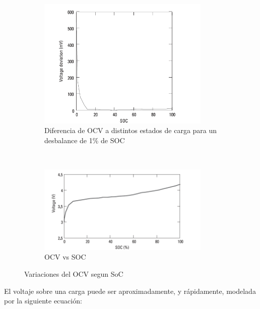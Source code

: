 \documentclass[10pt,a4paper]{article}
\begin{document}
\begin{figure}[h!]
    \begin{subfigure}[t]{.5\textwidth}
	\begin{center}
	    \includegraphics[width=0.9\textwidth]{diff_imbalance.png}
	    \caption{Diferencia de OCV a distintos estados de carga para un desbalance
	    de 1\% de SOC}
	    \label{diff_imbalance}
	\end{center}
    \end{subfigure}%
    ~
    \begin{subfigure}[t]{.5\textwidth}
	\begin{center}
	    \includegraphics[width=0.9\textwidth]{SOC_vs_OCV_equalization.png}
	    \caption{OCV vs SOC}
	    \label{OCV_SOC_equalization_figure}
	\end{center}
    \end{subfigure}
    \caption{Variaciones del OCV segun SoC}
    \label{rep_OCV_SOC}
\end{figure}
\FloatBarrier

\noindent El voltaje sobre una carga puede ser aproximadamente, y rápidamente,
modelada por la siguiente ecuación:
\end{document}
